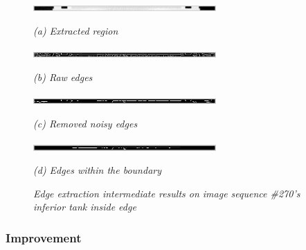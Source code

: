 \begin{figure}[htb]
  \begin{minipage}[b]{2.75in}
    \centering
    \centerline{\mbox{\includegraphics[width=2.75in]{data_extraction/images/sample/20121017_270/Coronal/inferior_inside/1_region.eps}}}
    \centerline{\emph{(a) Extracted region}}
  \end{minipage}\medskip
  \begin{minipage}[b]{2.75in}
    \centerline{\mbox{\includegraphics[width=2.75in]{data_extraction/images/sample/20121017_270/Coronal/inferior_inside/2_raw_edges.eps}}}
    \centerline{\emph{(b) Raw edges}}
  \end{minipage}
  \begin{minipage}[b]{2.75in}
    \centerline{\mbox{\includegraphics[width=2.75in]{data_extraction/images/sample/20121017_270/Coronal/inferior_inside/3_removed_noise.eps}}}
    \centerline{\emph{(c) Removed noisy edges}}
  \end{minipage}\medskip
  \begin{minipage}[b]{2.75in}
    \centerline{\mbox{\includegraphics[width=2.75in]{data_extraction/images/sample/20121017_270/Coronal/inferior_inside/4_within_boundary.eps}}}
    \centerline{\emph{(d) Edges within the boundary}}
  \end{minipage}
  \caption{\emph{Edge extraction intermediate results on image sequence \#270's inferior tank inside edge}}
  \label{fig:coronal_270_intermediate_results}
\end{figure}

\subsubsection{Improvement}

